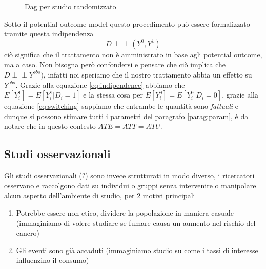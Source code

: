 \documentclass{article}
\begin{document}
\begin{figure}[!h]
\centering
\caption{Dag per studio randomizzato}
\label{fig:dag_random_EX}
\end{figure}

Sotto il potential outcome model questo procedimento può essere formalizzato tramite questa indipendenza
\begin{equation}
D \perp\!\!\!\perp (Y^{0},Y^{1})
\label{eq:indipendence}
\end{equation}
ciò significa che il trattamento non è amministrato in base agli potential outcome, ma a caso. Non bisogna però confondersi e pensare che ciò implica che  $D \perp\!\!\!\perp Y^{obs})$, infatti noi speriamo che il nostro trattamento abbia un effetto su $Y^{obs}$.
Grazie alla equazione \ref{eq:indipendence} abbiamo che $E[Y^1_i] = E[Y^{1}_i | D_i = 1]$ e la stessa cosa per $E[Y^0_i] = E[Y^{0}_i | D_i = 0]$, grazie alla equazione \ref{eq:switching} sappiamo che entrambe le quantità sono \textit{fattuali} e dunque si possono stimare tutti i parametri del paragrafo \ref{parag:param}, è da notare che in questo contesto $ATE = ATT = ATU$.
\subsection{Studi osservazionali}
Gli studi osservazionali (?) sono invece strutturati in modo diverso, i ricercatori osservano e raccolgono dati su individui o gruppi senza intervenire o manipolare alcun aspetto dell'ambiente di studio, per 2 motivi principali
\begin{enumerate}
\item Potrebbe essere non etico, dividere la popolazione in maniera casuale (immaginiamo di volere studiare se fumare causa un aumento nel rischio del cancro)
\item Gli eventi sono già accaduti (immaginiamo studio su come i tassi di interesse influenzino il consumo)
\end{enumerate}
\end{document}
